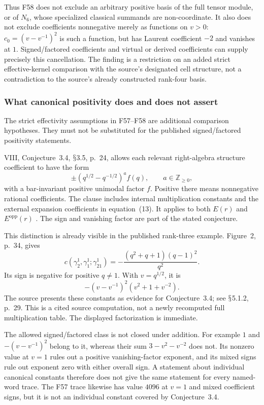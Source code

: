 \documentclass[11pt,a4paper]{article}
\renewcommand{\S}{\ensuremath{\mathsection}}
\newcommand{\fid}[1]{\textsf{#1}}\newcommand{\gate}[1]{\textsf{#1}}
\theoremstyle{named}\newtheorem{finding}{Finding}[section]
\theoremstyle{definition}\newtheorem{definition}[finding]{Definition}
\theoremstyle{remark}\newtheorem{remark}[finding]{Remark}
\begin{document}
Thus \fid{F58} does not exclude an arbitrary positive
basis of the full tensor module, or of \(N_6\), whose
specialized classical summands are non-coordinate.
It also does not exclude coefficients nonnegative merely
as functions on \(v>0\):
\(c_0=(v-v^{-1})^2\) is such a function, but has Laurent
coefficient \(-2\) and vanishes at \(1\).
Signed/factored coefficients and virtual or derived
coefficients can supply precisely this cancellation.
The finding is a restriction on an added strict
effective-kernel comparison with the source's designated
cell structure, not a contradiction to the source's
already constructed rank-four basis.

\subsubsection{What canonical positivity does and does not assert}

The strict effectivity assumptions in \fid{F57}--\fid{F58}
are additional comparison hypotheses.
They must not be substituted for the published
signed/factored positivity statements.

VIII, Conjecture~3.4, \S3.5, p.~24, allows each relevant
right-algebra structure coefficient to have the form
\[
       \pm(q^{1/2}-q^{-1/2})^a f(q),
       \qquad a\in\mathbb Z_{\ge0},
\]
with a bar-invariant positive unimodal factor \(f\).
Positive there means nonnegative rational coefficients.
The clause includes internal multiplication constants
and the external expansion coefficients in equation~(13).
It applies to both \(E(r)\) and \(E^{\mathrm{opp}}(r)\)
\cite{VIII}.
The sign and vanishing factor are part of the stated
conjecture.

This distinction is already visible in the published
rank-three example. Figure~2, p.~34, gives
\begin{equation}\label{eq:publishedsignedcanonicalconstant}
 c(\gamma_2^1,\gamma_1^1;\gamma_{21}^1)
       =-\frac{(q^2+q+1)(q-1)^2}{q^2}.
\end{equation}
Its sign is negative for positive \(q\ne1\).
With \(v=q^{1/2}\), it is
\[
              -(v-v^{-1})^2(v^2+1+v^{-2}).
\]
The source presents these constants as evidence for
Conjecture~3.4; see \S5.1.2, p.~29.
This is a cited source computation, not a newly
recomputed full multiplication table.
The displayed factorization is immediate.

The allowed signed/factored class is not closed under
addition. For example \(1\) and \(-(v-v^{-1})^2\)
belong to it, whereas their sum
\(3-v^2-v^{-2}\) does not.
Its nonzero value at \(v=1\) rules out a positive
vanishing-factor exponent, and its mixed signs rule
out exponent zero with either overall sign.
A statement about individual canonical constants
therefore does not give the same statement for every
named-word trace. The \fid{F57} trace likewise has
value \(4096\) at \(v=1\) and mixed coefficient signs,
but it is not an individual constant covered by
Conjecture~3.4.
\end{document}
